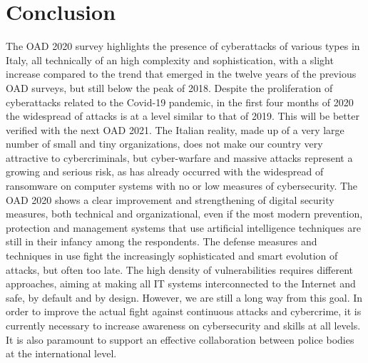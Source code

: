 \documentclass{easychair}
\begin{document}
\section{Conclusion}\label{sec:Conclusion}

The OAD 2020 survey highlights the presence of cyberattacks of various types in Italy, all technically of an high complexity and sophistication, with a slight increase 
compared to the trend that emerged in the twelve years of the previous OAD surveys, but still below the peak of 2018. Despite the proliferation of cyberattacks
related to the Covid-19 pandemic, in the first four months of 2020 the widespread of attacks is at a level similar to that of 2019. This will be better verified
with the next OAD 2021. The Italian reality, made up of a very large number of small and tiny organizations, does not make our country very attractive to cybercriminals, but cyber-warfare
and massive attacks represent a growing and serious risk, as has already occurred with the widespread of ransomware on computer systems with no or low
measures of cybersecurity. The OAD 2020 shows a clear improvement and strengthening of digital security measures, both technical and organizational, even if the most modern 
prevention, protection and management systems that use artificial intelligence techniques are still in their infancy among the respondents. The defense measures and techniques 
in use fight the increasingly sophisticated and smart evolution of attacks, but often too late. The high density of vulnerabilities 
requires different approaches, aiming at making all IT systems interconnected to the Internet and safe, by default and by design. However, we are 
still a long way from this goal. In order to improve the actual fight against continuous attacks and cybercrime, it is currently necessary to increase 
awareness on cybersecurity and skills at all levels. It is also paramount to support an effective collaboration between police bodies at the international level.



\end{document}
